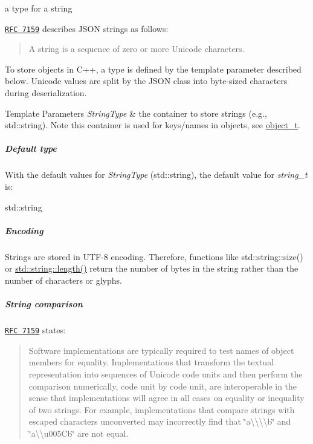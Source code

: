 a type for a string 

\href{http://rfc7159.net/rfc7159}{\tt R\+FC 7159} describes J\+S\+ON strings as follows\+: \begin{quote}
A string is a sequence of zero or more Unicode characters. \end{quote}


To store objects in C++, a type is defined by the template parameter described below. Unicode values are split by the J\+S\+ON class into byte-\/sized characters during deserialization.


\begin{DoxyTemplParams}{Template Parameters}
{\em String\+Type} & the container to store strings (e.\+g., {\ttfamily std\+::string}). Note this container is used for keys/names in objects, see \hyperlink{classnlohmann_1_1basic__json_a3cdea044cc3ecba1c4f9874a89daf6e4}{object\+\_\+t}.\\
\hline
\end{DoxyTemplParams}
\subparagraph*{Default type}

With the default values for {\itshape String\+Type} ({\ttfamily std\+::string}), the default value for {\itshape string\+\_\+t} is\+:


\begin{DoxyCode}
std::string
\end{DoxyCode}


\subparagraph*{Encoding}

Strings are stored in U\+T\+F-\/8 encoding. Therefore, functions like {\ttfamily std\+::string\+::size()} or {\ttfamily \hyperlink{namespaceboost_1_1units_1_1test_abb80de321402f6f139e1a1b182ea4655}{std\+::string\+::length()}} return the number of bytes in the string rather than the number of characters or glyphs.

\subparagraph*{String comparison}

\href{http://rfc7159.net/rfc7159}{\tt R\+FC 7159} states\+: \begin{quote}
Software implementations are typically required to test names of object members for equality. Implementations that transform the textual representation into sequences of Unicode code units and then perform the comparison numerically, code unit by code unit, are interoperable in the sense that implementations will agree in all cases on equality or inequality of two strings. For example, implementations that compare strings with escaped characters unconverted may incorrectly find that {\ttfamily \char`\"{}a\textbackslash{}\textbackslash{}\textbackslash{}\textbackslash{}b\char`\"{}} and {\ttfamily \char`\"{}a\textbackslash{}\textbackslash{}u005\+Cb\char`\"{}} are not equal. \end{quote}


